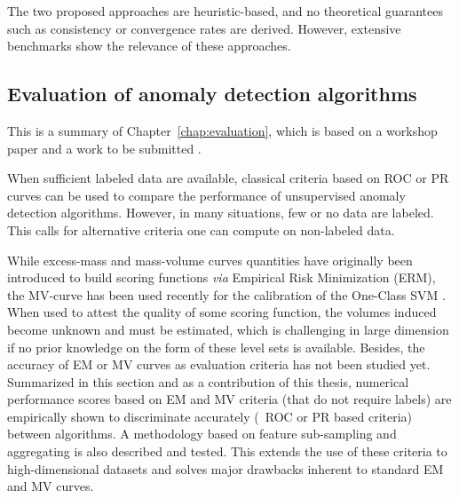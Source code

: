 The two proposed approaches are heuristic-based, and no theoretical guarantees such as consistency or convergence rates are derived. However, extensive benchmarks show the relevance of these approaches.

\subsection{Evaluation of anomaly detection algorithms}
\label{resume_fr:evaluation}
This is a summary of Chapter~\ref{chap:evaluation}, which is based on a workshop paper \citep{ICMLworkshop16} and a work to be submitted \citep{NIPS16evaluation}.


When sufficient labeled data are available, classical criteria based on ROC \citep{Provost1997, Provost1998, Fawcett2006} or PR \citep{Davis2006, Clemencon2009} curves can be used to compare the performance of unsupervised anomaly detection algorithms. However, in many situations, few or no data are labeled. This calls for alternative criteria one can compute on non-labeled data.

While excess-mass and mass-volume curves quantities have originally been introduced to build scoring functions \emph{via}
Empirical Risk Minimization (ERM), the MV-curve has been used recently for the calibration of the One-Class SVM \citep{Thomas2015}.
When used to attest the quality of some scoring function, the volumes induced become unknown and must be estimated, which is challenging in large dimension if no prior knowledge on the form of these level sets is available.
%
Besides, the accuracy of EM or MV curves as evaluation criteria has not been studied yet.
%
Summarized in this section and as a contribution of this thesis, numerical performance scores based on EM and MV criteria (that do not require labels) are empirically shown to discriminate accurately (\wrt~ROC or PR based criteria) between algorithms.
A methodology based on feature sub-sampling and aggregating is also described and tested. This extends the use of these criteria to high-dimensional datasets and solves major drawbacks inherent to standard EM and MV curves.

